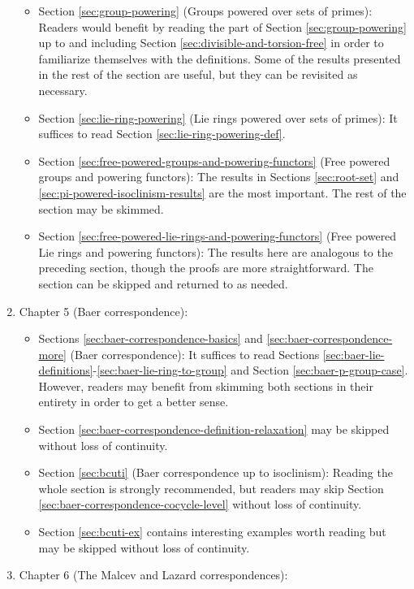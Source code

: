 \begin{enumerate}
\begin{itemize}
  \item Section \ref{sec:group-powering} (Groups powered over sets of
    primes): Readers would benefit by reading the part of Section
    \ref{sec:group-powering} up to and including Section
    \ref{sec:divisible-and-torsion-free} in order to familiarize
    themselves with the definitions. Some of the results presented in
    the rest of the section are useful, but they can be revisited as
    necessary.
  \item Section \ref{sec:lie-ring-powering} (Lie rings powered over sets
    of primes): It suffices to read Section
    \ref{sec:lie-ring-powering-def}.
  \item Section \ref{sec:free-powered-groups-and-powering-functors}
    (Free powered groups and powering functors): The results in Sections
    \ref{sec:root-set} and \ref{sec:pi-powered-isoclinism-results} are
    the most important. The rest of the section may be skimmed.
  \item Section \ref{sec:free-powered-lie-rings-and-powering-functors}
    (Free powered Lie rings and powering functors): The results here are
    analogous to the preceding section, though the proofs are more
    straightforward. The section can be skipped and returned to as
    needed.
  \end{itemize}
\item Chapter 5 (Baer correspondence):
  \begin{itemize}
  \item Sections \ref{sec:baer-correspondence-basics} and
    \ref{sec:baer-correspondence-more} (Baer correspondence): It suffices
    to read Sections
    \ref{sec:baer-lie-definitions}-\ref{sec:baer-lie-ring-to-group} and
    Section \ref{sec:baer-p-group-case}. However, readers may benefit
    from skimming both sections in their entirety in order to get a
    better sense.
  \item Section \ref{sec:baer-correspondence-definition-relaxation} may
    be skipped without loss of continuity.
  \item Section \ref{sec:bcuti} (Baer correspondence up to isoclinism):
    Reading the whole section is strongly recommended, but readers may
    skip Section \ref{sec:baer-correspondence-cocycle-level} without
    loss of continuity.
  \item Section \ref{sec:bcuti-ex} contains interesting examples worth
  reading but may be skipped without loss of continuity.
  \end{itemize}
\item Chapter 6 (The Malcev and Lazard correspondences):

\end{enumerate}
